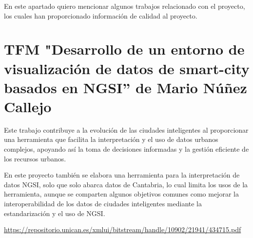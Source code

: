 
\begin{comment}
Este apartado sería parecido a un estado del arte de una tesis o tesina. En un trabajo final grado no parece obligada su presencia, aunque se puede dejar a juicio del tutor el incluir un pequeño resumen comentado de los trabajos y proyectos ya realizados en el campo del proyecto en curso. 
\end{comment}

En este apartado quiero mencionar algunos trabajos relacionado con el proyecto, los cuales han proporcionado información de calidad al proyecto.

 \section{TFM "Desarrollo de un entorno de visualización de datos de smart-city basados en NGSI” de Mario Núñez Callejo}
 
 Este trabajo contribuye a la evolución de las ciudades inteligentes al proporcionar una herramienta que facilita la interpretación y el uso de datos urbanos complejos, apoyando así la toma de decisiones informadas y la gestión eficiente de los recursos urbanos.

En este proyecto también se elabora una herramienta para la interpretación de datos NGSI, solo que solo abarca datos de Cantabria, lo cual limita los usos de la herramienta, aunque se comparten algunos objetivos comunes como mejorar la interoperabilidad de los datos de ciudades inteligentes mediante la estandarización y el uso de NGSI.

\url{https://repositorio.unican.es/xmlui/bitstream/handle/10902/21941/434715.pdf}